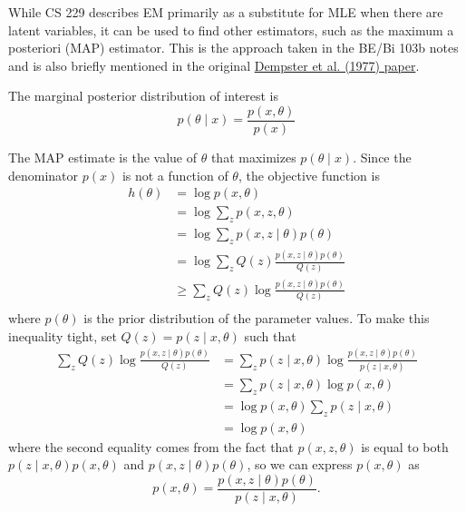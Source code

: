 \documentclass[11pt]{article}
\theoremstyle{definition}
\begin{document}
While CS 229 describes EM primarily as a substitute for MLE when there are latent variables, it can be used to find other estimators, such as the maximum a posteriori (MAP) estimator. This is the approach taken in the BE/Bi 103b notes and is also briefly mentioned in the original \href{https://doi.org/10.1111/j.2517-6161.1977.tb01600.x}{Dempster et al. (1977) paper}.

The marginal posterior distribution of interest is
$$
p(\theta \mid x)
= \frac{p(x, \theta)}{p(x)}
$$

The MAP estimate is the value of $\theta$ that maximizes $p(\theta \mid x)$. Since the denominator $p(x)$ is not a function of $\theta$, the objective function is
$$
\begin{aligned}
h(\theta)
&= \log p(x, \theta) \\
&= \log \sum_z p(x, z, \theta) \\
&= \log \sum_z p(x, z \mid \theta) p(\theta) \\
&= \log \sum_z Q(z) \frac{p(x, z \mid \theta) p(\theta)}{Q(z)} \\
&\geq \sum_z Q(z) \log \frac{p(x, z \mid \theta) p(\theta)}{Q(z)} \\
\end{aligned}
$$
where $p(\theta)$ is the prior distribution of the parameter values. To make this inequality tight, set $Q(z) = p(z \mid x, \theta)$ such that
$$
\begin{aligned}
\sum_z Q(z) \log \frac{p(x, z \mid \theta) p(\theta)}{Q(z)}
&= \sum_z p(z \mid x, \theta) \log \frac{p(x, z \mid \theta) p(\theta)}{p(z \mid x, \theta)} \\
&= \sum_z p(z \mid x, \theta) \log p(x, \theta) \\
&= \log p(x, \theta) \sum_z p(z \mid x, \theta) \\
&= \log p(x, \theta)
\end{aligned}
$$
where the second equality comes from the fact that $p(x, z, \theta)$ is equal to both $p(z \mid x, \theta) p(x, \theta)$ and $p(x, z \mid \theta) p(\theta)$, so we can express $p(x, \theta)$ as
$$
p(x, \theta) = \frac{p(x, z \mid \theta) p(\theta)}{p(z \mid x, \theta)}.
$$
\end{document}
